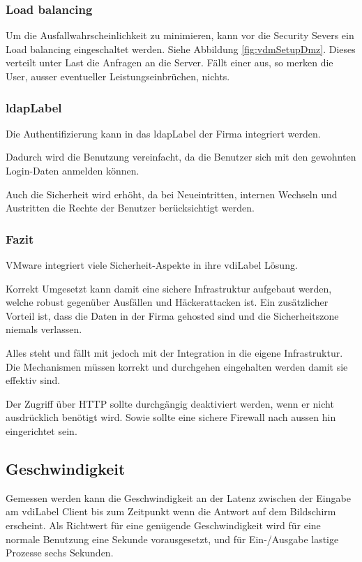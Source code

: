 \subsubsection{Load balancing}
Um die Ausfallwahrscheinlichkeit zu minimieren, kann vor die Security Severs ein Load balancing eingeschaltet werden. Siehe Abbildung \ref{fig:vdmSetupDmz}. Dieses verteilt unter Last die Anfragen an die Server. Fällt einer aus, so merken die User, ausser eventueller Leistungseinbrüchen, nichts.

\subsubsection{\Gls{ldapLabel}}
Die Authentifizierung kann in das \Gls{ldapLabel} der Firma integriert werden.

Dadurch wird die Benutzung vereinfacht, da die Benutzer sich mit den gewohnten Login-Daten anmelden können.

Auch die Sicherheit wird erhöht, da bei Neueintritten, internen Wechseln und Austritten die Rechte der Benutzer berücksichtigt werden.

\subsubsection{Fazit}
VMware integriert viele Sicherheit-Aspekte in ihre \Gls{vdiLabel} Lösung.

Korrekt Umgesetzt kann damit eine sichere Infrastruktur aufgebaut werden, welche robust gegenüber Ausfällen und Häckerattacken ist. Ein zusätzlicher Vorteil ist, dass die Daten in der Firma gehosted sind und die Sicherheitszone niemals verlassen.

Alles steht und fällt mit jedoch mit der Integration in die eigene Infrastruktur. Die Mechanismen müssen korrekt und durchgehen eingehalten werden damit sie effektiv sind.

Der Zugriff über HTTP sollte durchgängig deaktiviert werden, wenn er nicht ausdrücklich benötigt wird. Sowie sollte eine sichere Firewall nach aussen hin eingerichtet sein.

\subsection{Geschwindigkeit}
Gemessen werden kann die Geschwindigkeit an der Latenz zwischen der Eingabe am \Gls{vdiLabel} Client bis zum Zeitpunkt wenn die Antwort auf dem Bildschirm erscheint. Als Richtwert für eine genügende Geschwindigkeit wird für eine normale Benutzung eine Sekunde vorausgesetzt, und für Ein-/Ausgabe lastige Prozesse sechs Sekunden.

